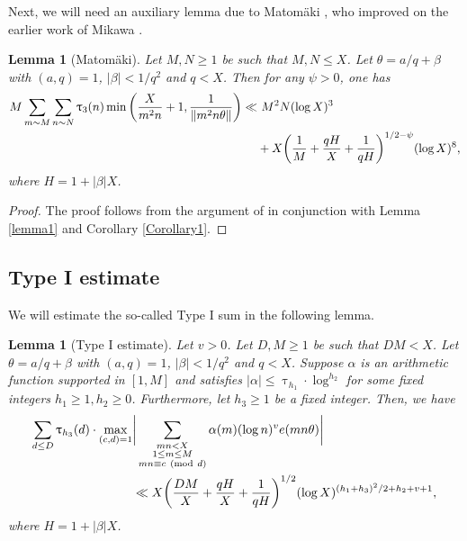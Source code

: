 \documentclass[12pt]{amsart}
\numberwithin{equation}{section}
\newtheorem{lemma}[theorem]{Lemma}
\theoremstyle{remark}
\theoremstyle{definition}
\newcommand{\imod}[1]{\ (\mathrm{mod}\ #1)}
\begin{document}
Next, we will need an auxiliary lemma due to Matom\"aki \cite[Lemma 8]{Mat}, who improved on the earlier work of Mikawa \cite{Mik}.

\begin{lemma}[Matom\"aki]\label{Mikawa}
Let $M, N\geq 1$ be such that $M, N\leq X$. Let $\theta= a/q + \beta$ with $(a, q)=1$, $|\beta\rvert <1/q^2$ and $q<X$. Then for any $\psi>0$, one has
\begin{align}
\notag M\sum_{m\sim M}\sum_{n\sim N}\uptau_3(n)\min\bigg(\dfrac{X}{m^2n} + 1, \dfrac{1}{\lVert m^2n \theta \rVert}\bigg)\ll &~M^2N(\log X)^3\\
\notag & + X\bigg(\dfrac{1}{M} + \dfrac{qH}{X} + \dfrac{1}{qH}\bigg)^{1/2-\psi}(\log X)^8,
\end{align}
where $H=1+|\beta|X$.
\end{lemma}

\begin{proof}
The proof follows from the argument of \cite[Lemma 8]{Mat} in conjunction with Lemma \ref{lemma1} and Corollary \ref{Corollary1}.
\end{proof} 












\subsection{Type I estimate}
We will estimate the so-called Type I sum in the following lemma.
\begin{lemma}[Type I estimate]\label{lemmatype1}
Let $v>0$. Let $D, M\geq 1$ be such that $DM<X$. Let $\theta=a/q+\beta$ with $(a, q)=1$, $\lvert \beta \rvert <1/q^2$ and $q<X$. Suppose ${\alpha}$ is an arithmetic function supported in $[1, M]$ and satisfies $\lvert {\alpha}\rvert \leq \uptau_{h_1}\cdot \log^{h_2}$ for some fixed integers $h_1\geq 1, h_2\geq 0$. Furthermore, let $h_3\geq 1$ be a fixed integer. Then, we have
\begin{align}
\notag \sum_{\substack{d\leq D}}\uptau_{h_3}(d)\cdot\max_{(c,d)=1}&\bigg\lvert \sum_{\substack{mn <X\\1\leq m\leq M\\mn\equiv c\imod d}}{\alpha}(m)(\log n)^ve(mn\theta)\bigg\rvert\\
\notag &\ll X\bigg(\dfrac{DM}{X} + \dfrac{qH}{X} + \dfrac{1}{qH}\bigg)^{1/2}(\log X)^{(h_1+h_3)^2/2 + h_2+v + 1},
\end{align}
where $H=1+|\beta|X$.
\end{lemma}
\end{document}
